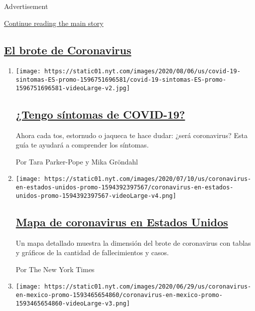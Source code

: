 Advertisement

\protect\hyperlink{after-mid2}{Continue reading the main story}

\hypertarget{el-brote-de-coronavirus}{%
\subsection{\texorpdfstring{\protect\hyperlink{}{El brote de
Coronavirus}}{El brote de Coronavirus}}\label{el-brote-de-coronavirus}}

\begin{enumerate}
\def\labelenumi{\arabic{enumi}.}
\item
  \texttt{[image: https://static01.nyt.com/images/2020/08/06/us/covid-19-sintomas-ES-promo-1596751696581/covid-19-sintomas-ES-promo-1596751696581-videoLarge-v2.jpg]}

  \hypertarget{tengo-suxedntomas-de-covid-19}{%
  \subsection{\texorpdfstring{\href{/es/interactive/2020/08/06/espanol/ciencia-y-tecnologia/tengo-covid-19-sintomas.html}{¿Tengo
  síntomas de
  COVID-19?}}{¿Tengo síntomas de COVID-19?}}\label{tengo-suxedntomas-de-covid-19}}

  Ahora cada tos, estornudo o jaqueca te hace dudar: ¿será coronavirus?
  Esta guía te ayudará a comprender los síntomas.

  Por Tara Parker-Pope y Mika Gröndahl
\item
  \texttt{[image: https://static01.nyt.com/images/2020/07/10/us/coronavirus-en-estados-unidos-promo-1594392397567/coronavirus-en-estados-unidos-promo-1594392397567-videoLarge-v4.png]}

  \hypertarget{mapa-de-coronavirus-en-estados-unidos}{%
  \subsection{\texorpdfstring{\href{/es/interactive/2020/espanol/mundo/coronavirus-en-estados-unidos.html}{Mapa
  de coronavirus en Estados
  Unidos}}{Mapa de coronavirus en Estados Unidos}}\label{mapa-de-coronavirus-en-estados-unidos}}

  Un mapa detallado muestra la dimensión del brote de coronavirus con
  tablas y gráficos de la cantidad de fallecimientos y casos.

  Por The New York Times
\item
  \texttt{[image: https://static01.nyt.com/images/2020/06/29/us/coronavirus-en-mexico-promo-1593465654860/coronavirus-en-mexico-promo-1593465654860-videoLarge-v3.png]}


\end{enumerate}
